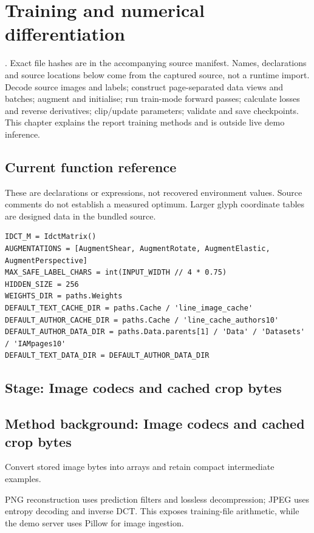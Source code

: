 \chapter{Training and numerical differentiation}\label{module:train}
. Exact file hashes are in the accompanying source manifest. Names, declarations and source locations below come from the captured source, not a runtime import.
Decode source images and labels; construct page-separated data views and batches; augment and initialise; run train-mode forward passes; calculate losses and reverse derivatives; clip/update parameters; validate and save checkpoints. This chapter explains the report training methods and is outside live demo inference.



\section*{Current function reference}
These are declarations or expressions, not recovered environment values. Source comments do not establish a measured optimum. Larger glyph coordinate tables are designed data in the bundled source.
\begin{lstlisting}[style=plain]
IDCT_M = IdctMatrix()
AUGMENTATIONS = [AugmentShear, AugmentRotate, AugmentElastic, AugmentPerspective]
MAX_SAFE_LABEL_CHARS = int(INPUT_WIDTH // 4 * 0.75)
HIDDEN_SIZE = 256
WEIGHTS_DIR = paths.Weights
DEFAULT_TEXT_CACHE_DIR = paths.Cache / 'line_image_cache'
DEFAULT_AUTHOR_CACHE_DIR = paths.Cache / 'line_cache_authors10'
DEFAULT_AUTHOR_DATA_DIR = paths.Data.parents[1] / 'Data' / 'Datasets' / 'IAMpages10'
DEFAULT_TEXT_DATA_DIR = DEFAULT_AUTHOR_DATA_DIR
\end{lstlisting}
\section*{Stage: Image codecs and cached crop bytes}
\section{Method background: Image codecs and cached crop bytes}\label{method:codec}
Convert stored image bytes into arrays and retain compact intermediate examples.


PNG reconstruction uses prediction filters and lossless decompression; JPEG uses entropy decoding and inverse DCT. This exposes training-file arithmetic, while the demo server uses Pillow for image ingestion.


